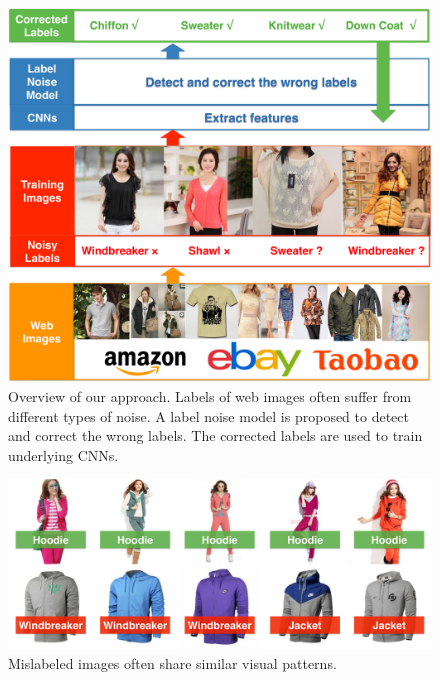 \documentclass[extendedabs]{bmvc2k}
\begin{document}
\begin{figure}[t]
\begin{center}
\includegraphics[width=0.8\linewidth]{figure/overview.pdf}
\end{center}
\caption{Overview of our approach. Labels of web images often suffer from different types of noise. A label noise model is proposed to detect and correct the wrong labels. The corrected labels are used to train underlying CNNs.}
\label{fig:overview}
\end{figure}

\begin{figure}[t]
\begin{center}
\includegraphics[width=0.8\linewidth]{figure/noise_cluster.pdf}
\end{center}
\caption{Mislabeled images often share similar visual patterns.}
\label{fig:noise_cluster}
\end{figure}


\end{document}
